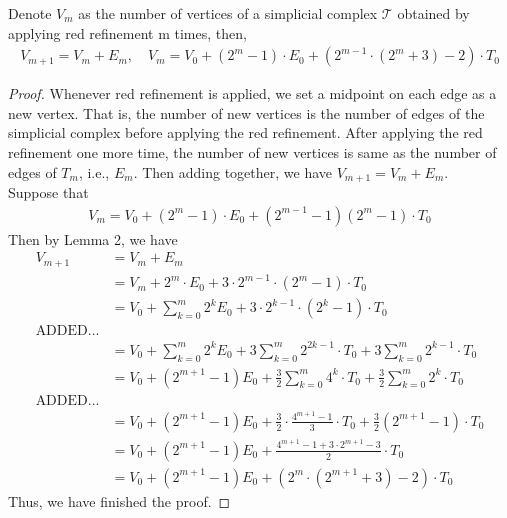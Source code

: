     \begin{lemma}
    Denote $V_{m}$ as the number of vertices of a simplicial complex $\mathcal{T}$ obtained by applying red refinement m times, then,
    \begin{align*}
    V_{m+1} = V_{m} + E_{m}, \quad V_m = V_0 + (2^m -1)\cdot E_0 + (2^{m-1}\cdot(2^m+3)-2)\cdot T_0
    \end{align*}
    \end{lemma}
    \begin{proof}
    Whenever red refinement is applied, we set a midpoint on each edge as a new vertex. That is, the number of new vertices is the number of edges of the simplicial complex before applying the red refinement. After applying the red refinement one more time, the number of new vertices is same as the number of edges of $T_m$, i.e., $E_m$. Then adding together, we have $V_{m+1} = V_m + E_m$.\\
    Suppose that 
    \begin{align*}
    V_m = V_0 + (2^m -1)\cdot E_0 + (2^{m-1} -1)(2^m -1)\cdot T_0
    \end{align*} 
    Then by Lemma 2, we have
    \begin{align*}
    V_{m+1} &= V_m + E_m\\
    &= V_m + 2^m\cdot E_0 + 3\cdot 2^{m-1}\cdot(2^m-1)\cdot T_0\\
    &= V_0 + \sum_{k=0}^m 2^k E_0 + 3\cdot 2^{k-1}\cdot(2^k-1)\cdot T_0\\
    \text{ADDED}...\\
    &= V_0 + \sum_{k=0}^m 2^k E_0 + 3\sum_{k=0}^m 2^{2k-1}\cdot T_0 + 3\sum_{k=0}^m 2^{k-1}\cdot T_0\\
    &= V_0 + (2^{m+1}-1)E_0 + \frac{3}{2}\sum_{k=0}^m 4^k\cdot T_0 + \frac{3}{2}\sum_{k=0}^m 2^k\cdot T_0\\
    \text{ADDED}...\\
    &= V_0 + (2^{m+1}-1)E_0 + \frac{3}{2}\cdot\frac{4^{m+1}-1}{3}\cdot T_0 + \frac{3}{2}(2^{m+1}-1)\cdot T_0\\
    &= V_0 + (2^{m+1}-1)E_0 + \frac{4^{m+1}-1 + 3\cdot2^{m+1} -3}{2}\cdot T_0\\
    &= V_0 + (2^{m+1}-1)E_0 + (2^m\cdot(2^{m+1}+3)-2)\cdot T_0
    \end{align*}
    Thus, we have finished the proof.
    \end{proof}


